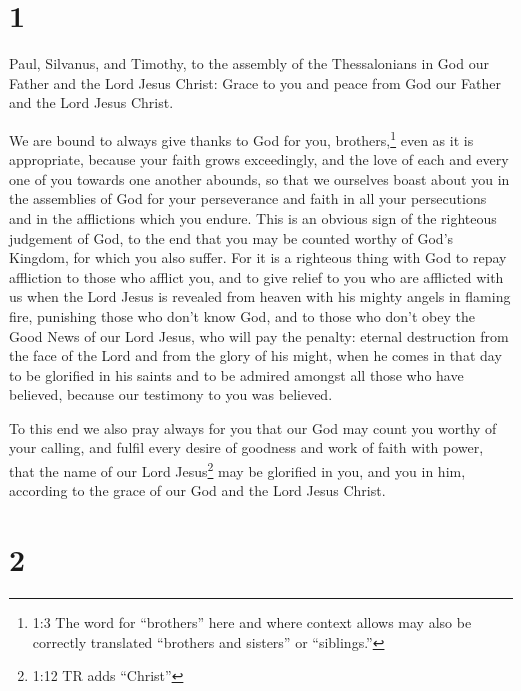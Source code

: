 \hypertarget{section}{%
\section{1}\label{section}}

 Paul, Silvanus, and Timothy, to the assembly of the
Thessalonians in God our Father and the Lord Jesus Christ: 
Grace to you and peace from God our Father and the Lord Jesus Christ.

 We are bound to always give thanks to God for you,
brothers,\footnote{1:3 The word for ``brothers'' here and where context
  allows may also be correctly translated ``brothers and sisters'' or
  ``siblings.''} even as it is appropriate, because your faith grows
exceedingly, and the love of each and every one of you towards one
another abounds,  so that we ourselves boast about you in
the assemblies of God for your perseverance and faith in all your
persecutions and in the afflictions which you endure.  This
is an obvious sign of the righteous judgement of God, to the end that
you may be counted worthy of God's Kingdom, for which you also suffer.
 For it is a righteous thing with God to repay affliction to
those who afflict you,  and to give relief to you who are
afflicted with us when the Lord Jesus is revealed from heaven with his
mighty angels in flaming fire,  punishing those who don't
know God, and to those who don't obey the Good News of our Lord Jesus,
 who will pay the penalty: eternal destruction from the face
of the Lord and from the glory of his might,  when he comes
in that day to be glorified in his saints and to be admired amongst all
those who have believed, because our testimony to you was believed.

 To this end we also pray always for you that our God may
count you worthy of your calling, and fulfil every desire of goodness
and work of faith with power,  that the name of our Lord
Jesus\footnote{1:12 TR adds ``Christ''} may be glorified in you, and you
in him, according to the grace of our God and the Lord Jesus Christ.

\hypertarget{section-1}{%
\section{2}\label{section-1}}


